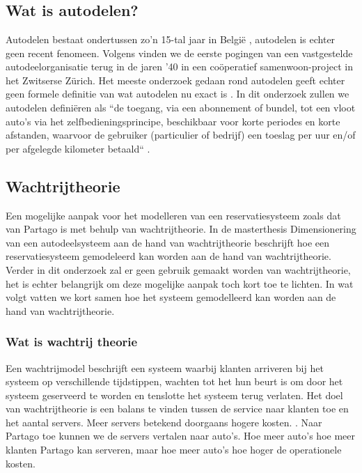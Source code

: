 \chapter{}
\label{ch:stand-van-zaken}



\section{Wat is autodelen?}
Autodelen bestaat ondertussen zo'n 15-tal jaar in België \autocite{ing}, autodelen is echter geen recent fenomeen. Volgens \textcite{millardball} vinden we de eerste pogingen van een vastgestelde autodeelorganisatie terug in de jaren '40 in een coöperatief samenwoon-project in het Zwitserse Zürich. Het meeste onderzoek gedaan rond autodelen geeft echter geen formele definitie van wat autodelen nu exact is \autocite{millardball}. In dit onderzoek zullen we autodelen definiëren als ``de toegang, via een abonnement of bundel, tot een vloot auto's via het zelfbedieningsprincipe, beschikbaar voor korte periodes en korte afstanden, waarvoor de gebruiker (particulier of bedrijf) een toeslag per uur en/of per afgelegde kilometer betaald`` \autocite{ing}.

\section{Wachtrijtheorie}
Een mogelijke aanpak voor het modelleren van een reservatiesysteem zoals dat van Partago is met behulp van wachtrijtheorie. In de masterthesis Dimensionering van een autodeelsysteem aan de hand van wachtrijtheorie beschrijft \textcite{van-buggenhout} hoe een reservatiesysteem gemodeleerd kan worden aan de hand van wachtrijtheorie. Verder in dit onderzoek zal er geen gebruik gemaakt worden van wachtrijtheorie, het is echter belangrijk om deze mogelijke aanpak toch kort toe te lichten. In wat volgt vatten we kort samen hoe het systeem gemodelleerd kan worden aan de hand van wachtrijtheorie.

\subsection{Wat is wachtrij theorie}
Een wachtrijmodel beschrijft een systeem waarbij klanten arriveren bij het systeem op verschillende tijdstippen, wachten tot het hun beurt is om door het systeem geserveerd te worden en tenslotte het systeem terug verlaten. Het doel van wachtrijtheorie is een balans te vinden tussen de service naar klanten toe en het aantal servers. Meer servers betekend doorgaans hogere kosten. \textcite{van-buggenhout}. Naar Partago toe kunnen we de servers vertalen naar auto's. Hoe meer auto's hoe meer klanten Partago kan serveren, maar hoe meer auto's hoe hoger de operationele kosten. 

